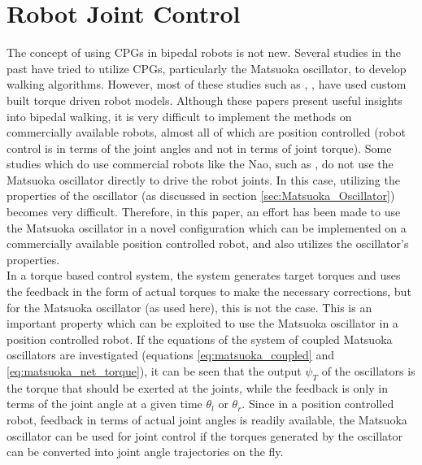 \documentclass[12pt,twoside]{article}
\theoremstyle{plain}
\theoremstyle{definition}
\theoremstyle{remark}
\newcommand{\forceindent}{\leavevmode{\parindent=2em\indent}}
\begin{document}
\section{Robot Joint Control}
\label{sec:Robot_Joint_Control}
The concept of using CPGs in bipedal robots is not new. Several studies in the past have tried to utilize CPGs, particularly the Matsuoka oscillator, to develop walking algorithms. However, most of these studies such as \cite{Taga1991}, \cite{nakanishi2004learning}, \cite{Ishiguro2003} have used custom built torque driven robot models. Although these papers present useful insights into bipedal walking, it is very difficult to implement the methods on commercially available robots, almost all of which are position controlled (robot control is in terms of the joint angles and not in terms of joint torque). Some studies which do use commercial robots like the Nao, such as \cite{cristiano2014locomotion}, do not use the Matsuoka oscillator directly to drive the robot joints. In this case, utilizing the properties of the oscillator (as discussed in section \ref{sec:Matsuoka_Oscillator}) becomes very difficult. Therefore, in this paper, an effort has been made to use the Matsuoka oscillator in a novel configuration which can be implemented on a commercially available position controlled robot, and also utilizes the oscillator's properties.\\
\forceindent In a torque based control system, the system generates target torques and uses the feedback in the form of actual torques to make the necessary corrections, but for the Matsuoka oscillator (as used here), this is not the case. This is an important property which can be exploited to use the Matsuoka oscillator in a position controlled robot. If the equations of the system of coupled Matsuoka oscillators are investigated (equations \ref{eq:matsuoka_coupled} and \ref{eq:matsuoka_net_torque}), it can be seen that the output $\psi_T$ of the oscillators is the torque that should be exerted at the joints, while the feedback is only in terms of the joint angle at a given time $\theta_l$ or $\theta_r$. Since in a position controlled robot, feedback in terms of actual joint angles is readily available, the Matsuoka oscillator can be used for joint control if the torques generated by the oscillator can be converted into joint angle trajectories on the fly.
\end{document}
